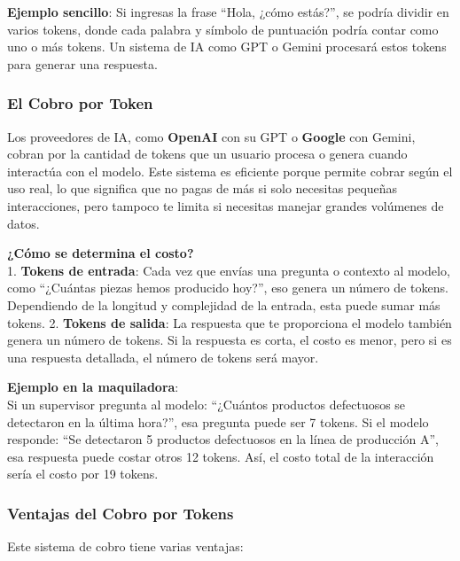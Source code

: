 \documentclass[
  10pt,
  letterpaper,
]{book}
\begin{document}
\textbf{Ejemplo sencillo}: Si ingresas la frase ``Hola, ¿cómo estás?'',
se podría dividir en varios tokens, donde cada palabra y símbolo de
puntuación podría contar como uno o más tokens. Un sistema de IA como
GPT o Gemini procesará estos tokens para generar una respuesta.

\subsubsection{\texorpdfstring{\textbf{El Cobro por
Token}}{El Cobro por Token}}\label{el-cobro-por-token}

Los proveedores de IA, como \textbf{OpenAI} con su GPT o \textbf{Google}
con Gemini, cobran por la cantidad de tokens que un usuario procesa o
genera cuando interactúa con el modelo. Este sistema es eficiente porque
permite cobrar según el uso real, lo que significa que no pagas de más
si solo necesitas pequeñas interacciones, pero tampoco te limita si
necesitas manejar grandes volúmenes de datos.

\textbf{¿Cómo se determina el costo?}\\
1. \textbf{Tokens de entrada}: Cada vez que envías una pregunta o
contexto al modelo, como ``¿Cuántas piezas hemos producido hoy?'', eso
genera un número de tokens. Dependiendo de la longitud y complejidad de
la entrada, esta puede sumar más tokens. 2. \textbf{Tokens de salida}:
La respuesta que te proporciona el modelo también genera un número de
tokens. Si la respuesta es corta, el costo es menor, pero si es una
respuesta detallada, el número de tokens será mayor.

\textbf{Ejemplo en la maquiladora}:\\
Si un supervisor pregunta al modelo: ``¿Cuántos productos defectuosos se
detectaron en la última hora?'', esa pregunta puede ser 7 tokens. Si el
modelo responde: ``Se detectaron 5 productos defectuosos en la línea de
producción A'', esa respuesta puede costar otros 12 tokens. Así, el
costo total de la interacción sería el costo por 19 tokens.

\subsubsection{\texorpdfstring{\textbf{Ventajas del Cobro por
Tokens}}{Ventajas del Cobro por Tokens}}\label{ventajas-del-cobro-por-tokens}

Este sistema de cobro tiene varias ventajas:
\end{document}
